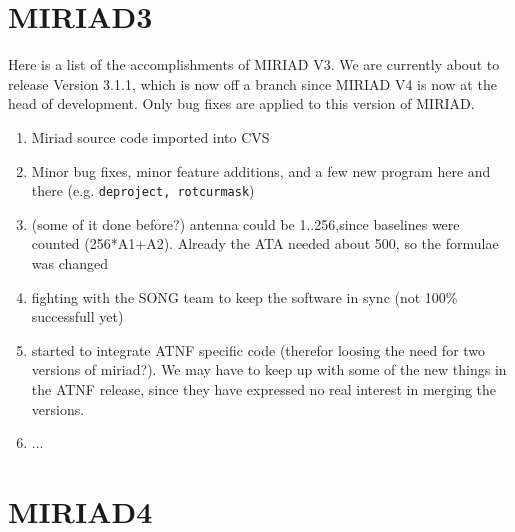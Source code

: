 \section{MIRIAD3}

Here is a list of the accomplishments of MIRIAD V3. We are currently about
to release Version 3.1.1, which is now off a branch since MIRIAD V4 is
now at the head of development. Only bug fixes are applied to this version
of MIRIAD.

\begin{enumerate}

\item
Miriad source code imported into CVS

\item
Minor bug fixes, minor feature additions,
and a few new program here and there (e.g. {\tt deproject, rotcurmask})

\item
(some of it done before?)
antenna could be 1..256,since baselines were counted (256*A1+A2).  Already the
ATA needed about 500, so the formulae was changed

\item
fighting with the SONG team to keep the software in sync (not 100\% successfull yet)

\item
started to integrate ATNF specific code (therefor loosing the need for two
versions of miriad?). We may have to keep up with some of the new things
in the ATNF release, since they have expressed no real interest in
merging the versions.

\item
...

\end{enumerate}


\section{MIRIAD4}

